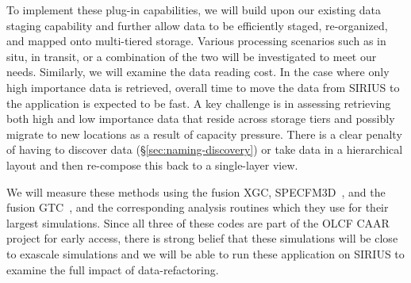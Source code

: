 To implement these plug-in capabilities, we will build upon our existing data staging 
capability and further allow data to be
efficiently staged, re-organized, and mapped onto multi-tiered storage. Various
processing scenarios such as in situ, in transit, or a combination of the two
will be investigated to meet our needs.
Similarly, we will examine the data reading cost. In the case where only high importance data is retrieved,
overall time to move the data from SIRIUS to the
application is expected to be fast. A key challenge is in assessing retrieving
both high and low importance data that reside across storage tiers and possibly migrate to
new locations as a result of capacity pressure. There is a
clear penalty of having to discover data (\S\ref{sec:naming-discovery}) or take data in a hierarchical layout and then re-compose
this back to a single-layer view.  

We will measure these methods using the fusion XGC, SPECFM3D~\cite{SPECFEM3D}, and the
fusion GTC~\cite{klasky2003grid}, and the
corresponding analysis routines which they use for their largest simulations.
Since all three of these codes are part of the
OLCF CAAR~\cite{CAAR} project for early access, there is strong belief that these
simulations will be close to exascale simulations and we will be able to run
these application on SIRIUS to examine the full impact of data-refactoring.

